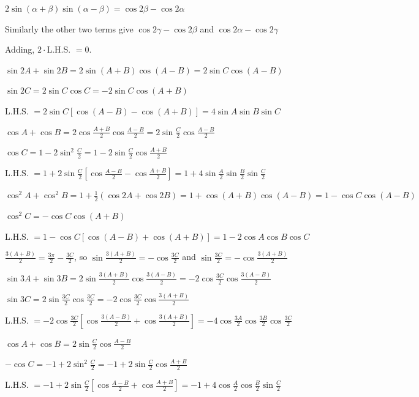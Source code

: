 \item $2\sin(\alpha + \beta)\sin(\alpha - \beta) = \cos 2\beta - \cos 2\alpha$

  Similarly the other two terms give $\cos 2\gamma - \cos 2\beta$ and $\cos 2\alpha - \cos 2\gamma$

  Adding, $2\cdot$L.H.S. $= 0$.

\item $\sin 2A + \sin 2B = 2\sin(A + B)\cos(A - B) = 2\sin C\cos(A - B)$

  $\sin 2C = 2\sin C\cos C = -2\sin C\cos(A + B)$

  L.H.S. $= 2\sin C[\cos(A - B) - \cos(A + B)] = 4\sin A\sin B\sin C$

\item $\cos A + \cos B = 2\cos\frac{A + B}{2}\cos\frac{A - B}{2} = 2\sin\frac{C}{2}\cos\frac{A - B}{2}$

  $\cos C = 1 - 2\sin^2\frac{C}{2} = 1 - 2\sin\frac{C}{2}\cos\frac{A + B}{2}$

  L.H.S. $= 1 + 2\sin\frac{C}{2}\left[\cos\frac{A - B}{2} - \cos\frac{A + B}{2}\right] = 1 +
  4\sin\frac{A}{2}\sin\frac{B}{2}\sin\frac{C}{2}$

\item $\cos^2 A + \cos^2 B = 1 + \frac{1}{2}(\cos 2A + \cos 2B) = 1 + \cos(A + B)\cos(A - B) = 1 - \cos C\cos(A - B)$

  $\cos^2 C = -\cos C\cos(A + B)$

  L.H.S. $= 1 - \cos C[\cos(A - B) + \cos(A + B)] = 1 - 2\cos A\cos B\cos C$

\item $\frac{3(A + B)}{2} = \frac{3\pi}{2} - \frac{3C}{2}$, so $\sin\frac{3(A + B)}{2} = -\cos\frac{3C}{2}$ and
  $\sin\frac{3C}{2} = -\cos\frac{3(A + B)}{2}$

  $\sin 3A + \sin 3B = 2\sin\frac{3(A + B)}{2}\cos\frac{3(A - B)}{2} = -2\cos\frac{3C}{2}\cos\frac{3(A - B)}{2}$

  $\sin 3C = 2\sin\frac{3C}{2}\cos\frac{3C}{2} = -2\cos\frac{3C}{2}\cos\frac{3(A + B)}{2}$

  L.H.S. $= -2\cos\frac{3C}{2}\left[\cos\frac{3(A - B)}{2} + \cos\frac{3(A + B)}{2}\right] =
  -4\cos\frac{3A}{2}\cos\frac{3B}{2}\cos\frac{3C}{2}$

\item $\cos A + \cos B = 2\sin\frac{C}{2}\cos\frac{A - B}{2}$

  $-\cos C = -1 + 2\sin^2\frac{C}{2} = -1 + 2\sin\frac{C}{2}\cos\frac{A + B}{2}$

  L.H.S. $= -1 + 2\sin\frac{C}{2}\left[\cos\frac{A - B}{2} + \cos\frac{A + B}{2}\right] = -1 +
  4\cos\frac{A}{2}\cos\frac{B}{2}\sin\frac{C}{2}$

